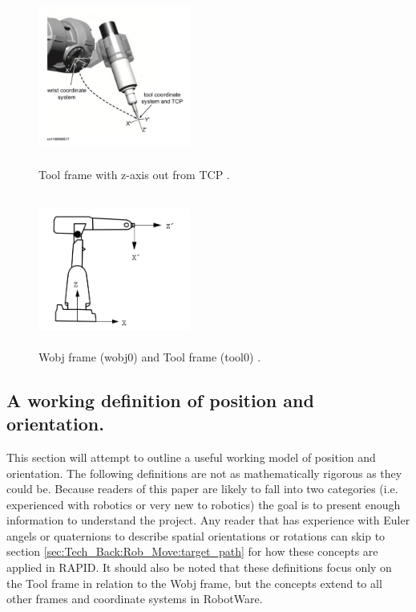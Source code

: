 \documentclass{cslthse-msc}
\begin{document}
\begin{figure}[H]
\centering
\begin{minipage}{.49\textwidth}
  \centering
  \includegraphics[width=5cm,height=5cm]{TCP_frame_3_88.png}
  \caption{Tool frame with z-axis out from TCP \cite[Sec. 3.88]{ABB:rapid_instructions}.}
  \label{fig:TCP_frame}
\end{minipage}%
\hspace{0.10cm}
\begin{minipage}{.49\textwidth}
  \centering
    \includegraphics[width=5cm,height= 5cm]{wobj0_tool0.png}
    \caption{Wobj frame (wobj0) and Tool frame (tool0) \cite[Sec. 3.53]{ABB:rapid_instructions}.}
    \label{fig:wobj0_tool0}
\end{minipage}
\end{figure}


\subsection{A working definition of position and orientation.}
\label{sec:Tech_Back:Rob_Move:pos_orient}
This section will attempt to outline a useful working model of position and orientation. The following definitions are not as mathematically rigorous as they could be. Because readers of this paper are likely to fall into two categories (i.e. experienced with robotics or very new to robotics) the goal is to present enough information to understand the project. Any reader that has experience with Euler angels or quaternions to describe spatial orientations or rotations can skip to section \ref{sec:Tech_Back:Rob_Move:target_path} for how these concepts are applied in RAPID. It should also be noted that these definitions focus only on the Tool frame in relation to the Wobj frame, but the concepts extend to all other frames and coordinate systems in RobotWare.\par
\end{document}
